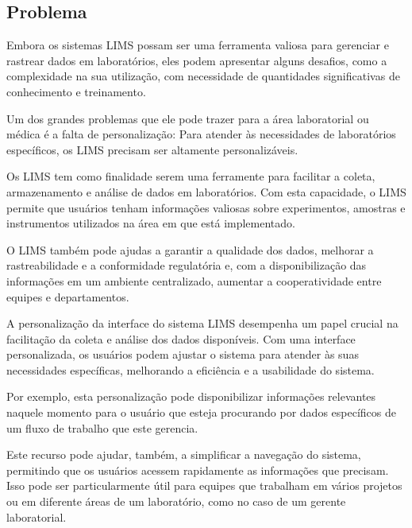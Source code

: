 \subsection{Problema}

Embora os sistemas LIMS possam ser uma ferramenta valiosa para gerenciar e rastrear dados em laboratórios, eles podem apresentar alguns desafios, como a complexidade na sua utilização, com necessidade de quantidades significativas de conhecimento e treinamento. \R

Um dos grandes problemas que ele pode trazer para a área laboratorial ou médica é a falta de personalização: Para atender às necessidades de laboratórios específicos, os LIMS precisam ser altamente personalizáveis.

Os LIMS tem como finalidade serem uma ferramente para facilitar a coleta, armazenamento e análise de dados em laboratórios. Com esta capacidade, o LIMS permite que usuários tenham informações valiosas sobre experimentos, amostras e instrumentos utilizados na área em que está implementado.

O LIMS também pode ajudas a garantir a qualidade dos dados, melhorar a rastreabilidade e a conformidade regulatória e, com a disponibilização das informações em um ambiente centralizado, aumentar a cooperatividade entre equipes e departamentos.

A personalização da interface do sistema LIMS desempenha um papel crucial na facilitação da coleta e análise dos dados disponíveis. Com uma interface personalizada, os usuários podem ajustar o sistema para atender às suas necessidades específicas, melhorando a eficiência e a usabilidade do sistema.

Por exemplo, esta personalização pode disponibilizar informações relevantes naquele momento para o usuário que esteja procurando por dados específicos de um fluxo de trabalho que este gerencia.

Este recurso pode ajudar, também, a simplificar a navegação do sistema, permitindo que os usuários acessem rapidamente as informações que precisam. Isso pode ser particularmente útil para equipes que trabalham em vários projetos ou em diferente áreas de um laboratório, como no caso de um gerente laboratorial.